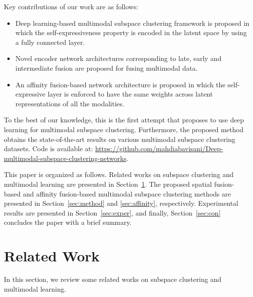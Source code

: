 \documentclass[journal]{IEEEtran}
\begin{document}
Key contributions of our work are as follows:
\begin{itemize}
	\item Deep learning-based multimodal subspace clustering framework is proposed in which the self-expressiveness property is encoded in the latent space by using a fully connected layer.  
	\item Novel encoder network architectures corresponding to late, early and intermediate fusion are proposed for fusing multimodal data. 
	\item An affinity fusion-based network architecture is proposed in which the self-expressive layer is enforced to have the same weights across latent representations of all the modalities.   
	\end{itemize}
To the best of our knowledge, this is the first attempt that proposes to use deep learning for multimodal subspace clustering. Furthermore, the proposed method obtains the state-of-the-art results on various  multimodal subspace clustering datasets.  Code is available at: \url{https://github.com/mahdiabavisani/Deep-multimodal-subspace-clustering-networks}.

This paper is organized as follows. Related works on subspace clustering and multimodal learning are presented in Section~\ref{sec:background}.  The proposed spatial fusion-based and affinity fusion-based multimodal subspace clustering methods are presented in Section~\ref{sec:method} and \ref{sec:affinity}, respectively. Experimental results are presented in Section~\ref{sec:exper}, and finally, Section~\ref{sec:con} concludes the paper with a brief summary. 




 
	 

\section{Related Work}\label{sec:background}
In this section, we review some related works on subspace clustering and multimodal learning.  
\end{document}
